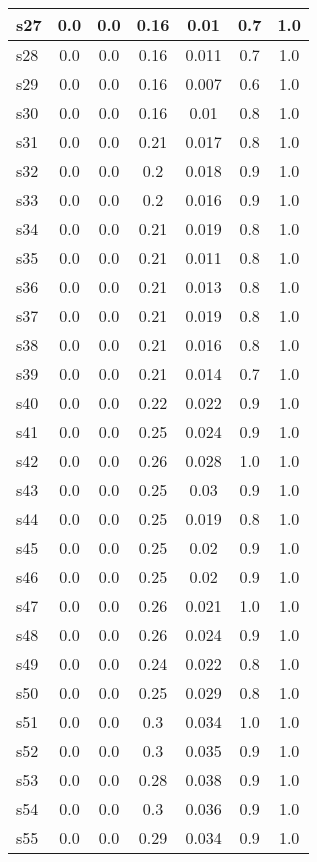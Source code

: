 \documentclass{article}
\begin{document}
\begin{tabular}{|l|c|c|c|c|c|c|}
\hline
s27 &0.0 & 0.0 & 0.16 & 0.01 & 0.7 & 1.0\\
\hline
s28 &0.0 & 0.0 & 0.16 & 0.011 & 0.7 & 1.0\\
\hline
s29 &0.0 & 0.0 & 0.16 & 0.007 & 0.6 & 1.0\\
\hline
s30 &0.0 & 0.0 & 0.16 & 0.01 & 0.8 & 1.0\\
\hline
s31 &0.0 & 0.0 & 0.21 & 0.017 & 0.8 & 1.0\\
\hline
s32 &0.0 & 0.0 & 0.2 & 0.018 & 0.9 & 1.0\\
\hline
s33 &0.0 & 0.0 & 0.2 & 0.016 & 0.9 & 1.0\\
\hline
s34 &0.0 & 0.0 & 0.21 & 0.019 & 0.8 & 1.0\\
\hline
s35 &0.0 & 0.0 & 0.21 & 0.011 & 0.8 & 1.0\\
\hline
s36 &0.0 & 0.0 & 0.21 & 0.013 & 0.8 & 1.0\\
\hline
s37 &0.0 & 0.0 & 0.21 & 0.019 & 0.8 & 1.0\\
\hline
s38 &0.0 & 0.0 & 0.21 & 0.016 & 0.8 & 1.0\\
\hline
s39 &0.0 & 0.0 & 0.21 & 0.014 & 0.7 & 1.0\\
\hline
s40 &0.0 & 0.0 & 0.22 & 0.022 & 0.9 & 1.0\\
\hline
s41 &0.0 & 0.0 & 0.25 & 0.024 & 0.9 & 1.0\\
\hline
s42 &0.0 & 0.0 & 0.26 & 0.028 & 1.0 & 1.0\\
\hline
s43 &0.0 & 0.0 & 0.25 & 0.03 & 0.9 & 1.0\\
\hline
s44 &0.0 & 0.0 & 0.25 & 0.019 & 0.8 & 1.0\\
\hline
s45 &0.0 & 0.0 & 0.25 & 0.02 & 0.9 & 1.0\\
\hline
s46 &0.0 & 0.0 & 0.25 & 0.02 & 0.9 & 1.0\\
\hline
s47 &0.0 & 0.0 & 0.26 & 0.021 & 1.0 & 1.0\\
\hline
s48 &0.0 & 0.0 & 0.26 & 0.024 & 0.9 & 1.0\\
\hline
s49 &0.0 & 0.0 & 0.24 & 0.022 & 0.8 & 1.0\\
\hline
s50 &0.0 & 0.0 & 0.25 & 0.029 & 0.8 & 1.0\\
\hline
s51 &0.0 & 0.0 & 0.3 & 0.034 & 1.0 & 1.0\\
\hline
s52 &0.0 & 0.0 & 0.3 & 0.035 & 0.9 & 1.0\\
\hline
s53 &0.0 & 0.0 & 0.28 & 0.038 & 0.9 & 1.0\\
\hline
s54 &0.0 & 0.0 & 0.3 & 0.036 & 0.9 & 1.0\\
\hline
s55 &0.0 & 0.0 & 0.29 & 0.034 & 0.9 & 1.0\\

\end{tabular}
\end{document}
